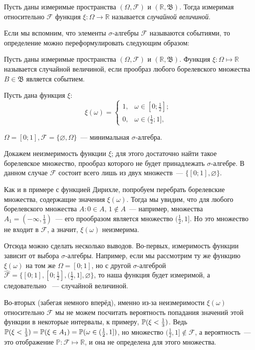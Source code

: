 \begin{defn}
    Пусть даны измеримые пространства $(\Omega, \mathcal{F})$ и $(\mathbb{R}, \mathfrak{B})$. Тогда измеримая относительно $\mathcal{F}$ функция $\xi: \Omega \to \mathbb{R}$ называется {\it случайной величиной}.
\end{defn}
\begin{rmrk}
    Если мы вспомним, что элементы $\sigma$-алгебры $\mathcal{F}$ называются событиями, то определение можно переформулировать следующим образом: 
    
    Пусть даны измеримые пространства $(\Omega, \mathcal{F})$ и $(\mathbb{R}, \mathfrak{B})$. Функция $\xi \colon \Omega \mapsto \mathbb{R}$ называется случайной величиной, если прообраз любого борелевского множества $B \in \mathfrak{B}$ является событием.
\end{rmrk}
\begin{exmp} Пусть дана функция $\xi$:
\begin{equation*}
    \xi(\omega) = 
    \begin{cases}
        1, & \omega \in \left[0; \frac{1}{2} \right]; \\
        0, & \omega \in (\frac{1}{2}; 1],
    \end{cases}
\end{equation*}

$\Omega = [0; 1], \mathcal{F} = \{\varnothing, \Omega\}$~--- минимальная ${\sigma \text{-алгебра}}$.  

Докажем неизмеримость функции $\xi$; для этого достаточно найти такое борелевское множество, прообраз которого не будет принадлежать ${\sigma \text{-алгебре}}$. В данном случае $\mathcal{F}$ состоит всего лишь из двух множеств~--- $\{[0; 1], \varnothing\}$.

Как и в примере с функцией Дирихле, попробуем перебрать борелевские множества, содержащие значения $\xi(\omega)$. Тогда мы увидим, что для любого борелевского множества $A \colon 0 \in A, \, 1 \notin A$~--- например, множества ${A_1 = (-\infty, \frac{1}{3})}$~--- его прообразом является множество $(\frac{1}{2}, 1]$. Но это множество не входит в $\mathcal{F}$, а значит, $\xi(\omega)$ неизмерима.

Отсюда можно сделать несколько выводов. Во-первых, измеримость функции зависит от выбора ${\sigma \text{-алгебры}}$. Например, если мы рассмотрим ту же функцию $\xi(\omega)$ на том же $\Omega = [0; 1]$, но с другой ${\sigma \text{-алгеброй}}$ ${\widehat{\mathcal{F}} = \{[0; 1], [0; \frac{1}{2}], (\frac{1}{2}, 1], \varnothing\}}$, то наша функция будет измеримой, а следовательно ~--- случайной величиной.

Во-вторых (забегая немного вперёд), именно из-за неизмеримости $\xi(\omega)$ относительно $\mathcal{F}$ мы не можем посчитать вероятность попадания значений этой функции в некоторые интервалы, к примеру, ${\mathbb{P}(\xi < \frac{1}{3})}$. Ведь ${\mathbb{P}(\xi < \frac{1}{3})} = {\mathbb{P}(\xi \in A_1)} = {\mathbb{P}(\omega \in (\frac{1}{2}, 1])}$, но множество $(\frac{1}{2}, 1] \notin \mathcal{F}$, а вероятность~--- это отображение $\mathbb{P}: \mathcal{F} \mapsto \mathbb{R}$, и она не определена для этого множества.
\end{exmp} 

